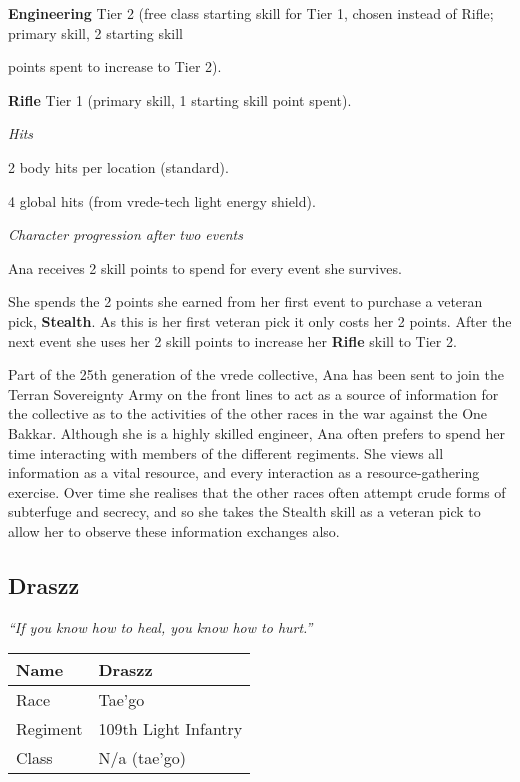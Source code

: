 \documentclass{scrbook}
\begin{document}
\textbf{Engineering} Tier 2 (free class starting skill for Tier 1, chosen instead of Rifle; primary skill, 2 starting skill

points spent to increase to Tier 2).

\textbf{Rifle} Tier 1 (primary skill, 1 starting skill point spent).

\textit{Hits}

2 body hits per location (standard).

4 global hits (from vrede-tech light energy shield).

\textit{Character progression after two events}

Ana receives 2 skill points to spend for every event she survives.

She spends the 2 points she earned from her first event to purchase a veteran pick, \textbf{Stealth}. As this is her first veteran pick it only costs her 2 points. After the next event she uses her 2 skill points to increase her \textbf{Rifle} skill to Tier 2.

Part of the 25th generation of the vrede collective, Ana has been sent to join the Terran Sovereignty Army on the front lines to act as a source of information for the collective as to the activities of the other races in the war against the One Bakkar. Although she is a highly skilled engineer, Ana often prefers to spend her time interacting with members of the different regiments. She views all information as a vital resource, and every interaction as a resource-gathering exercise. Over time she realises that the other races often attempt crude forms of subterfuge and secrecy, and so she takes the Stealth skill as a veteran pick to allow her to observe these information exchanges also.

\subsection{Draszz}

\textit{``If you know how to heal, you know how to hurt.''}

\begin{table}
\begin{tabular}{|l|l|} \hline 
Name & Draszz \\
 \hline Race & Tae'go \\
 \hline Regiment & 109th Light Infantry \\
 \hline Class & N/a (tae'go) \\
 \hline \end{tabular}

\end{table}
\end{document}
